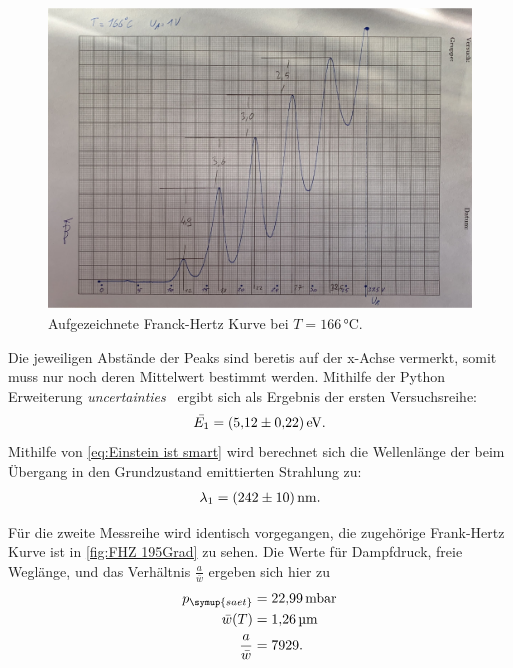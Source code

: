 \begin{figure}[H]
  \centering
  \includegraphics[height=8cm]{content/data/FH_166.pdf}
  \caption{Aufgezeichnete Franck-Hertz Kurve bei $T=166\,\unit{\celsius}$.}
  \label{fig:FHZ 166Grad}
\end{figure}

Die jeweiligen Abstände der Peaks sind beretis auf der x-Achse vermerkt, somit muss nur noch deren
Mittelwert bestimmt werden. Mithilfe der Python Erweiterung \textit{uncertainties}~\cite{uncertainties} 
ergibt sich als Ergebnis der ersten Versuchsreihe:
\begin{gather*}
    \bar{E_1}=\qty{5.12+-0.22}{\electronvolt}.
\end{gather*}
Mithilfe von \eqref{eq:Einstein ist smart} wird berechnet sich die Wellenlänge der beim Übergang in den
Grundzustand emittierten Strahlung zu:
\begin{gather*}
  \lambda_1=\qty{242+-10}{\nano\meter}.
\end{gather*}

Für die zweite Messreihe wird identisch vorgegangen, die zugehörige Frank-Hertz Kurve ist in \autoref{fig:FHZ 195Grad} zu sehen.
Die Werte für Dampfdruck, freie Weglänge, und das Verhältnis $\frac{a}{\bar{w}}$ ergeben sich hier zu
\begin{align*}
  p_{\symup{saet}} &= \qty{22.99}{\milli\bar} \\
  \bar{w}(T) &= \qty{1.26}{\micro\meter} \\
  \frac{a}{\bar{w}} &= \num{7929}.
\end{align*}

